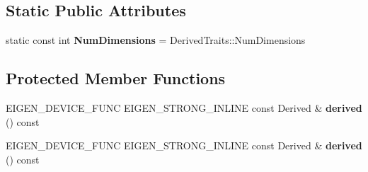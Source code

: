 \subsection*{Static Public Attributes}
\begin{DoxyCompactItemize}
\item 
\mbox{\label{class_eigen_1_1_tensor_base_3_01_derived_00_01_read_only_accessors_01_4_a82f0b5a5870c36ed869285fcdebb57c4}} 
static const int {\bfseries Num\+Dimensions} = Derived\+Traits\+::\+Num\+Dimensions
\end{DoxyCompactItemize}
\subsection*{Protected Member Functions}
\begin{DoxyCompactItemize}
\item 
\mbox{\label{class_eigen_1_1_tensor_base_3_01_derived_00_01_read_only_accessors_01_4_adc1b9a9aa14fc0aaaf39d7b4964e8e04}} 
E\+I\+G\+E\+N\+\_\+\+D\+E\+V\+I\+C\+E\+\_\+\+F\+U\+NC E\+I\+G\+E\+N\+\_\+\+S\+T\+R\+O\+N\+G\+\_\+\+I\+N\+L\+I\+NE const Derived \& {\bfseries derived} () const
\item 
\mbox{\label{class_eigen_1_1_tensor_base_3_01_derived_00_01_read_only_accessors_01_4_adc1b9a9aa14fc0aaaf39d7b4964e8e04}} 
E\+I\+G\+E\+N\+\_\+\+D\+E\+V\+I\+C\+E\+\_\+\+F\+U\+NC E\+I\+G\+E\+N\+\_\+\+S\+T\+R\+O\+N\+G\+\_\+\+I\+N\+L\+I\+NE const Derived \& {\bfseries derived} () const
\end{DoxyCompactItemize}
